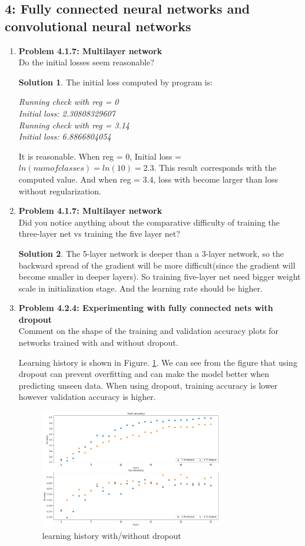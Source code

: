\documentclass[]{book}
\theoremstyle{definition}
\newtheorem*{soln}{Solution}
\begin{document}
\subsection*{4: Fully connected neural networks and convolutional neural networks  }
\begin{enumerate}
	\item \textbf{Problem 4.1.7: Multilayer network} \\
	Do the initial losses seem reasonable? 
	\begin{soln}
	The initial loss computed by program is: 
	
	\textit{Running check with reg =  0 \\Initial loss:  2.30808329607 \\Running check with reg =  3.14 \\Initial loss:  6.8866804054 	}
	
	It is reasonable. When reg = 0, Initial loss = $ln(num of classes) = ln(10) = 2.3$. This result corresponds with the computed value. And when reg = 3.4, loss with become larger than loss without regularization.
	
	\end{soln}
	\item \textbf{Problem 4.1.7: Multilayer network} \\
	Did you notice anything	about the comparative difficulty of training the three-layer net vs training the five layer net? 
	\begin{soln}
        The 5-layer network is deeper than a 3-layer network, so the backward spread of the gradient will be more difficult(since the gradient will become smaller in deeper layers). So training five-layer net need bigger weight scale in initialization stage. And the learning rate should be higher.
	\end{soln}

	\item \textbf{Problem 4.2.4: Experimenting with fully connected nets with dropout} \\
	Comment on the shape of the training and validation	accuracy plots for networks trained with and without dropout.
	
	Learning history is shown in Figure. \ref{fig:dropout}. We can see from the figure  that using dropout can prevent overfitting and can make the model better when predicting unseen data. When using dropout, training accuracy is lower however validation accuracy is higher. 
	\begin{figure}[H]
		\centering
		\includegraphics[width=8cm]{dropoutVSnondropout.png}
		\caption{learning history with/without dropout}
		\label{fig:dropout}
	\end{figure}
\end{enumerate}
\end{document}
